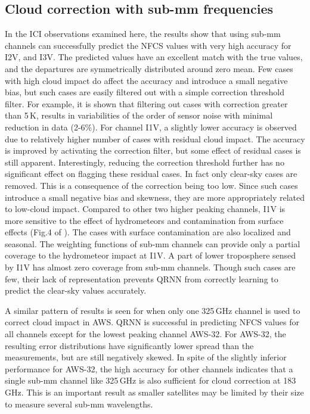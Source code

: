 \documentclass[amt, manuscript]{copernicus}
\begin{document}
\subsection{Cloud correction with sub-mm frequencies }
%
In the ICI observations examined here, the results show that using sub-mm channels can successfully predict the NFCS values with very high accuracy for I2V, and I3V. The predicted values have an excellent match with the true values, and the departures are symmetrically distributed around zero mean. Few cases with high cloud impact do affect the accuracy and introduce a small negative bias, but such cases are easily filtered out with a simple correction threshold filter. For example, it is shown that filtering out cases with correction greater than 5\,K, results in variabilities of the order of sensor noise with minimal reduction in data (2-6\%). For channel I1V, a slightly lower accuracy is observed due to relatively higher number of cases with residual cloud impact. The accuracy is improved by activating the correction filter, but some effect of residual cases is still apparent. Interestingly, reducing the correction threshold further has no significant effect on flagging these residual cases. In fact only clear-sky cases are removed. This is a consequence of the correction being too low. Since such cases introduce a small negative bias and skewness, they are more appropriately related to low-cloud impact. Compared to other two higher peaking channels, I1V is more sensitive to the effect of hydrometeors  and contamination from surface effects (Fig.4 of \citet{eriksson:towar:20}). The cases with surface contamination are also localized and seasonal. The weighting functions of sub-mm channels can provide only a partial coverage to the hydrometeor impact at I1V. A part of lower troposphere sensed by I1V has almost zero coverage from sub-mm channels. Though such cases are few, their lack of representation prevents QRNN from correctly learning to predict the clear-sky values accurately.

A similar pattern of results is seen for when only one 325\,GHz channel is used to correct cloud impact in AWS. QRNN is successful in predicting NFCS values for all channels except for the lowest peaking channel AWS-32. For AWS-32, the resulting error distributions have significantly lower spread than the measurements, but are still negatively skewed. In spite of the slightly inferior performance for AWS-32, the high accuracy for other channels indicates that a single sub-mm channel like 325\,GHz is also sufficient for cloud correction at 183\,GHz. This is an important result as smaller satellites may be limited by their size to measure several sub-mm wavelengths.
\end{document}
